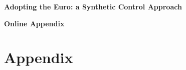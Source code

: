 \documentclass[12pt]{article}
\begin{document}
\clearpage
\singlespace



\clearpage

\begin{appendices}

\setcounter{page}{1}
\setcounter{table}{0}
\setcounter{figure}{0}
\renewcommand{\thepage}{\roman{page}}
\renewcommand{\thetable}{\Alph{section}.\arabic{table}}
\renewcommand{\thefigure}{\Alph{section}.\arabic{figure}}
\renewcommand{\theEquation}{\Alph{section}.\arabic{Equation}}

\begin{titlepage}

\begin{center}
\textbf{\huge{Adopting the Euro: a Synthetic Control Approach}}\\

\vspace{4em}

\textbf{\huge{Online Appendix}}\\

\end{center}

\thispagestyle{empty}

\end{titlepage}


\section{Appendix}

\end{appendices}
\end{document}
